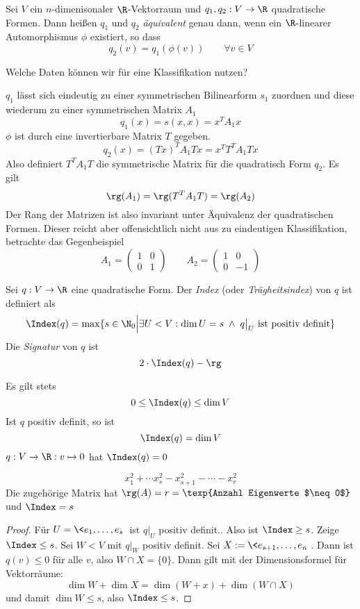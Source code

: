 \documentclass{mycourse}
\begin{document}
\begin{df}
	\label{df:15.8}
	Sei $V$ ein $n$-dimenisonaler $\R$-Vektorraum und $q_1,q_2 : V\to \R$ quadratische Formen.
	Dann heißen $q_1$ und $q_2$ \emph{äquivalent} genau dann, wenn ein $\R$-linearer Automorphismus $\phi$ existiert, so dass
	\[
		q_2(v) = q_1(\phi(v)) \qquad \forall v\in V
	\]
\end{df}

Welche Daten können wir für eine Klassifikation nutzen?

$q_1$ lässt sich eindeutig zu einer symmetrischen Bilinearform $s_1$ zuordnen und diese wiederum zu einer symmetrischen Matrix $A_1$
\[
	q_1(x) = s(x,x) = x^TA_1x
\]
$\phi$ ist durch eine invertierbare Matrix $T$ gegeben.
\[
	q_2(x) = (Tx)^TA_1Tx = x^T T^TA_1Tx
\]
Also definiert $T^TA_1T$ die symmetrische Matrix für die quadratisch Form $q_2$.
Es gilt
\[
	\rg(A_1) = \rg(T^TA_1T) = \rg(A_2)
\]
Der Rang der Matrizen ist also invariant unter Äquivalenz der quadratischen Formen.
Dieser reicht aber offensichtlich nicht aus zu eindeutigen Klassifikation, betrachte das Gegenbeispiel
\[
	A_1 = \begin{pmatrix}1&0\\0&1\end{pmatrix}\qquad A_2 = \begin{pmatrix}1&0\\0&-1\end{pmatrix}
\]


\begin{df}
	\label{df:15.9}
	Sei $q:V\to \R$ eine quadratische Form.
	Der \emph{Index} (oder \emph{Trägheitsindex}) von $q$ ist definiert als
	\[
		\Index(q) = \max\{s \in \N_0 \Big| \exists U < V : \dim U=s \; \land\; q\big|_U \text{ ist positiv definit}\}
	\]
	Die \emph{Signatur} von $q$ ist
	\[
		2 \cdot \Index(q) - \rg
	\]
	\begin{note}
		Es gilt stets
		\[
			0 \le \Index(q) \le \dim V
		\]
		Ist $q$ positiv definit, so ist
		\[
			\Index(q) = \dim V
		\]
		$q:V\to \R: v\mapsto 0$ hat $\Index(q)=0$
	\end{note}
\end{df}

\begin{ex}
	\[
		x_1^2 + \dotsb x_s^2 - x_{s+1}^2 - \dotsb - x_r^2
	\]
	Die zugehörige Matrix hat $\rg(A) = r = \texp{Anzahl Eigenwerte $\neq 0$}$ und $\Index=s$
	
	\begin{proof}
		Für $U = \<e_1,\dotsc, e_s\>$ ist $q|_U$ positiv definit..
		Also ist $\Index \ge s$.
		Zeige $\Index \le s$.
		Sei $W< V$ mit $q|_W$ positiv definit.
		Sei $X:= \<e_{s+1},\dotsc, e_n\>$.
		Dann ist $q(v) \le 0$ für alle $v$, also $W\cap X = \{0\}$.
		Dann gilt mit der Dimensionsformel für Vektorräume:
		\[
			\dim W + \dim X = \dim (W+x) + \dim(W\cap X)
		\]
		und damit $\dim W \le s$, also $\Index \le s$.
	\end{proof}	
\end{ex}
\end{document}
